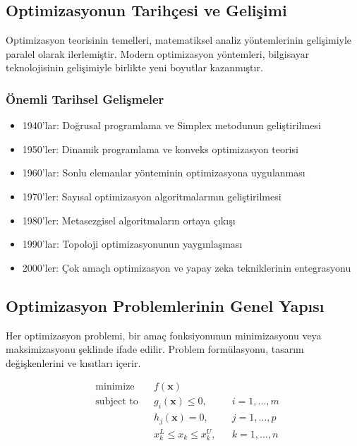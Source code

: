 \subsection{Optimizasyonun Tarihçesi ve Gelişimi}
Optimizasyon teorisinin temelleri, matematiksel analiz yöntemlerinin gelişimiyle paralel olarak ilerlemiştir. Modern optimizasyon yöntemleri, bilgisayar teknolojisinin gelişimiyle birlikte yeni boyutlar kazanmıştır. 

\subsubsection{Önemli Tarihsel Gelişmeler}
\begin{itemize}
    \item 1940'lar: Doğrusal programlama ve Simplex metodunun geliştirilmesi
    \item 1950'ler: Dinamik programlama ve konveks optimizasyon teorisi
    \item 1960'lar: Sonlu elemanlar yönteminin optimizasyona uygulanması
    \item 1970'ler: Sayısal optimizasyon algoritmalarının geliştirilmesi
    \item 1980'ler: Metasezgisel algoritmaların ortaya çıkışı
    \item 1990'lar: Topoloji optimizasyonunun yaygınlaşması
    \item 2000'ler: Çok amaçlı optimizasyon ve yapay zeka tekniklerinin entegrasyonu
\end{itemize}

\subsection{Optimizasyon Problemlerinin Genel Yapısı}
Her optimizasyon problemi, bir amaç fonksiyonunun minimizasyonu veya maksimizasyonu şeklinde ifade edilir. Problem formülasyonu, tasarım değişkenlerini ve kısıtları içerir. 

\begin{equation}
\begin{aligned}
& \text{minimize} & & f(\mathbf{x}) \\
& \text{subject to} & & g_i(\mathbf{x}) \leq 0, & & i = 1,\ldots,m \\
& & & h_j(\mathbf{x}) = 0, & & j = 1,\ldots,p \\
& & & x_k^L \leq x_k \leq x_k^U, & & k = 1,\ldots,n
\end{aligned}
\end{equation}

